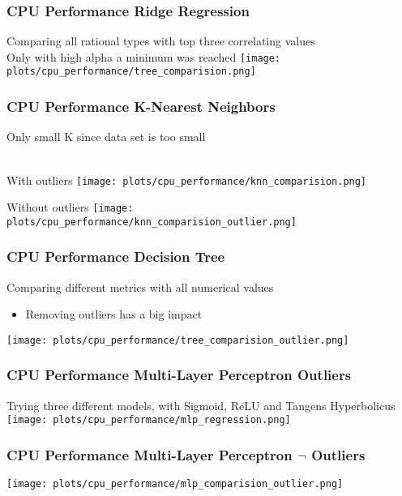 \documentclass[aspectratio=169]{beamer}
\begin{document}
\begin{frame}{}
\frametitle{CPU Performance Ridge Regression}
Comparing all rational types with top three correlating values\\Only with high alpha a minimum was reached
    \center \texttt{[image: plots/cpu\_performance/tree\_comparision.png]}
\end{frame}

\begin{frame}{}
\frametitle{CPU Performance K-Nearest Neighbors}
\center Only small K since data set is too small\\ ~\\
\begin{minipage}{0.49\textwidth}
\center With outliers
   \texttt{[image: plots/cpu\_performance/knn\_comparision.png]}
\end{minipage}
 \begin{minipage}{0.49\textwidth}
 \center Without outliers
   \texttt{[image: plots/cpu\_performance/knn\_comparision\_outlier.png]}
\end{minipage}
\end{frame}

\begin{frame}{}
\frametitle{CPU Performance Decision Tree}
\center Comparing different metrics with all numerical values\\
\begin{minipage}{0.3\textwidth}
	\begin{itemize}
	\item Removing outliers has a big impact
	\end{itemize}
\end{minipage}
\begin{minipage}{0.69\textwidth}
  \center \texttt{[image: plots/cpu\_performance/tree\_comparision\_outlier.png]}
\end{minipage}
\end{frame}

\begin{frame}{}
\frametitle{CPU Performance Multi-Layer Perceptron Outliers}
\center Trying three different models, with Sigmoid, ReLU and Tangens Hyperbolicus
    \center \texttt{[image: plots/cpu\_performance/mlp\_regression.png]}
\end{frame}

\begin{frame}{}
\frametitle{CPU Performance Multi-Layer Perceptron $\neg$ Outliers}
    \center \texttt{[image: plots/cpu\_performance/mlp\_comparision\_outlier.png]}
\end{frame}
\end{document}

